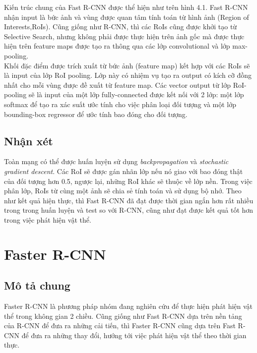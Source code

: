Kiến trúc chung của Fast R-CNN được thể hiện như trên hình 4.1. Fast R-CNN nhận input là bức ảnh và vùng được quan tâm tính toán từ hình ảnh (Region of Interests,RoIs). Cũng giống như R-CNN, thì các RoIs cũng được khởi tạo từ Selective Search, nhưng không phải được thực hiện trên ảnh gốc mà được thực hiện trên feature maps được tạo ra thông qua các lớp convolutional và lớp max-pooling.\\

Khối đặc điểm được trích xuất từ bức ảnh (feature map) kết hợp với các RoIs sẽ là input của lớp RoI pooling. Lớp này có nhiệm vụ tạo ra output có kích cỡ đồng nhất cho mỗi vùng được đề xuất từ feature map. Các vector output từ lớp RoI-pooling sẽ là input của một lớp fully-connected được kết nối với 2 lớp: một lớp softmax để tạo ra xác suất ước tính cho việc phân loại  đối tượng và một lớp bounding-box regressor để ước tính bao đóng cho đối tượng.\\

\subsection{Nhận xét}

Toàn mạng có thể được huấn luyện sử dụng \textit{backpropagation} và \textit{stochastic gradient descent}. Các RoI sẽ được gán nhãn lớp nếu nó giao với bao đóng thật của đối tượng hơn 0.5, ngược lại, những RoI khác sẽ thuộc về lớp nền. Trong việc phân lớp, RoIs từ cùng một ảnh sẽ chia sẻ tính toán và sử dụng bộ nhớ. Theo như kết quả hiện thực, thì Fast R-CNN đã đạt được thời gian ngắn hơn rất nhiều trong trong huấn luyện và test so với R-CNN, cũng như đạt được kết quả tốt hơn trong việc phát hiện vật thể.

\section{Faster R-CNN}

\subsection{Mô tả chung}

Faster R-CNN \cite{Ren2015} là phương pháp nhóm đang nghiên cứu để thực hiện phát hiện vật thể trong không gian 2 chiều. Cũng giống như Fast R-CNN dựa trên nền tảng của R-CNN để đưa ra những cải tiến, thì Faster R-CNN cũng dựa trên Fast R-CNN để đưa ra những thay đổi, hướng tới việc phát hiện vật thể theo thời gian thực. \\

